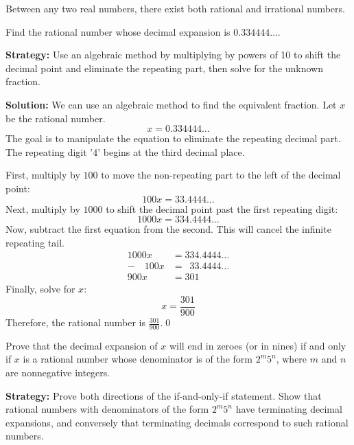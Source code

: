 \begin{theorem}
Between any two real numbers, there exist both rational and irrational numbers.
\end{theorem}



\begin{problembox}
Find the rational number whose decimal expansion is $0.334444\ldots$.
\end{problembox}

\noindent\textbf{Strategy:} Use an algebraic method by multiplying by powers of 10 to shift the decimal point and eliminate the repeating part, then solve for the unknown fraction.

\bigskip\noindent\textbf{Solution:}
We can use an algebraic method to find the equivalent fraction. Let $x$ be the rational number.
$$x = 0.334444\ldots$$
The goal is to manipulate the equation to eliminate the repeating decimal part. The repeating digit '4' begins at the third decimal place.

First, multiply by $100$ to move the non-repeating part to the left of the decimal point:
$$100x = 33.4444\ldots$$
Next, multiply by $1000$ to shift the decimal point past the first repeating digit:
$$1000x = 334.4444\ldots$$
Now, subtract the first equation from the second. This will cancel the infinite repeating tail.
\begin{align*}
1000x &= 334.4444\ldots \\
-\quad 100x &= \phantom{0}33.4444\ldots \\
\hline
900x &= 301
\end{align*}
Finally, solve for $x$:
$$x = \frac{301}{900}$$
Therefore, the rational number is \textbf{$\frac{301}{900}$}.\qed



\begin{problembox}
Prove that the decimal expansion of $x$ will end in zeroes (or in nines) if and only if $x$ is a rational number whose denominator is of the form $2^m 5^n$, where $m$ and $n$ are nonnegative integers.
\end{problembox}

\noindent\textbf{Strategy:} Prove both directions of the if-and-only-if statement. Show that rational numbers with denominators of the form $2^m 5^n$ have terminating decimal expansions, and conversely that terminating decimals correspond to such rational numbers.

